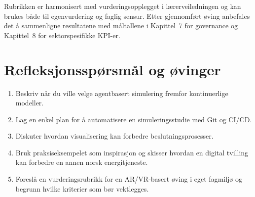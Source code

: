 Rubrikken er harmonisert med vurderingsopplegget i lærerveiledningen og kan brukes både til egenvurdering og faglig sensur. Etter gjennomført øving anbefales det å sammenligne resultatene med måltallene i Kapittel~7 for governance og Kapittel~8 for sektorspesifikke KPI-er.

\section{Refleksjonsspørsmål og øvinger}
\begin{enumerate}
    \item Beskriv når du ville velge agentbasert simulering fremfor kontinuerlige modeller.
    \item Lag en enkel plan for å automatisere en simuleringsstudie med Git og CI/CD.
    \item Diskuter hvordan visualisering kan forbedre beslutningsprosesser.
    \item Bruk praksiseksempelet som inspirasjon og skisser hvordan en digital tvilling kan forbedre en annen norsk energitjeneste.
    \item Foreslå en vurderingsrubrikk for en AR/VR-basert øving i eget fagmiljø og begrunn hvilke kriterier som bør vektlegges.
\end{enumerate}
